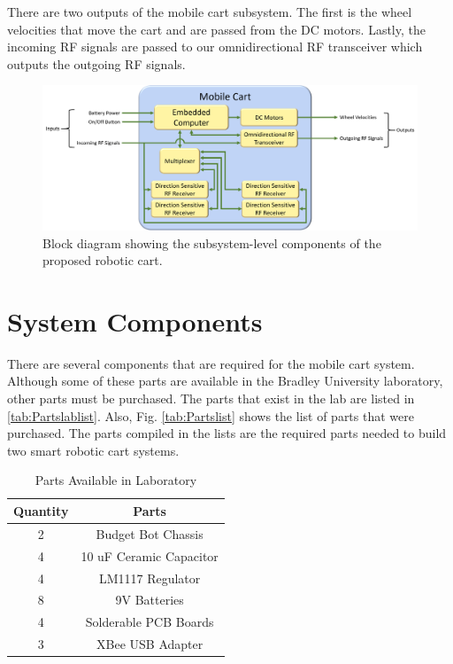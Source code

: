 \vspace*{12pt}
\noindent
There are two outputs of the mobile cart subsystem. The first is the wheel velocities that move the cart and are passed from the DC motors. Lastly, the incoming RF signals are passed to our omnidirectional RF transceiver which outputs the outgoing RF signals.

\begin{figure}[h!]
  \centering
  \includegraphics[width=\textwidth]{figs/img/mobileCartBlockDiagram.png}
  \caption{Block diagram showing the subsystem-level components of the proposed robotic cart.}
  \label{fig:mobile_block_diag}
\end{figure}


\section{System Components}
There are several components that are required for the mobile cart system. Although some of these parts are available in the Bradley University laboratory, other parts must be purchased. The parts that exist in the lab are listed in \autoref{tab:Partslablist}. Also, Fig. \ref{tab:Partslist} shows the list of parts that were purchased. The parts compiled in the lists are the required parts needed to build two smart robotic cart systems.

\begin{table}[h!]
  \centering
  \caption{Parts Available in Laboratory}
  \begin{tabular}{c|c}
      \toprule
      \textbf{Quantity} & \textbf{Parts}\\
      \toprule
      2 & Budget Bot Chassis\\
      4 & 10 uF Ceramic Capacitor\\
      4 & LM1117 Regulator\\
      8 & 9V Batteries\\
      4 & Solderable PCB Boards\\
      3 & XBee USB Adapter\\
      \bottomrule
  \end{tabular}
  \label{tab:Partslablist}
\end{table}

